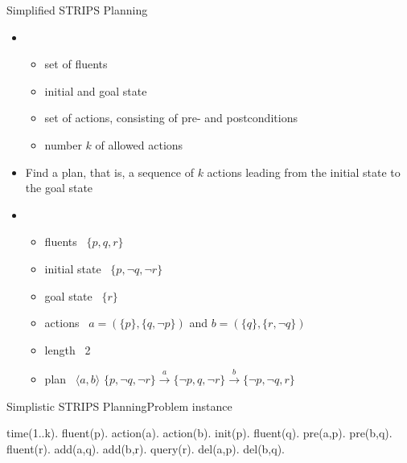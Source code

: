 \begin{frame}{Simplified STRIPS Planning}

  \begin{itemize}
  \item<2-> 
    \begin{itemize}
    \item set of fluents
    \item initial and goal state
    \item set of actions, consisting of pre- and postconditions
    \item number $k$ of allowed actions
    \end{itemize}
  \item<2-> 
    Find a plan, that is, a sequence of $k$ actions leading from the initial state to the goal state
    \smallskip
  \item<3-> 
    \begin{itemize}
    \item fluents       \ $\{p,     q,     r\}$
    \item initial state \ $\{p,\neg q,\neg r\}$
    \item goal state    \ $\{r\}$
    \item actions       \ $a = (\{p\},\{q,\neg p\})$ and $b = (\{q\},\{r,\neg q\})$
    \item length        \ 2
      \medskip
    \item<4-> plan      \ $\langle a, b \rangle$
      \qquad
      \(
      \{     p,\neg q,\neg r\}
      \stackrel{a}{\longrightarrow}
      \{\neg p,     q,\neg r\}
      \stackrel{b}{\longrightarrow}
      \{\neg p,\neg q,     r\}
      \)
    \end{itemize}
    \medskip
  \end{itemize}

\end{frame}
\begin{frame}{Simplistic STRIPS Planning}{Problem instance}
\begin{semiverbatim}
time(1..k).
\pause
fluent(p).     action(a).     action(b).       init(p).
fluent(q).        pre(a,p).      pre(b,q).
fluent(r).        add(a,q).      add(b,r).     query(r).
                  del(a,p).      del(b,q).
\end{semiverbatim}
\end{frame}
